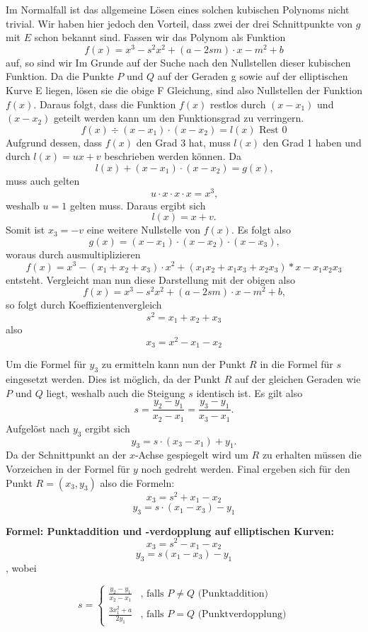 Im Normalfall ist das allgemeine Lösen eines solchen kubischen Polynoms nicht trivial. Wir haben hier jedoch den Vorteil, dass zwei der drei Schnittpunkte von $g$ mit $E$ schon bekannt sind. Fassen wir das Polynom als Funktion $$f(x) = x^3 - s^2x^2 + (a-2sm)\cdot x - m^2+b$$ auf, so sind wir Im Grunde auf der Suche nach den Nullstellen dieser kubischen Funktion. Da die Punkte $P$ und $Q$ auf der Geraden g sowie auf der elliptischen Kurve E liegen, lösen sie die obige F
Gleichung, sind also Nullstellen der Funktion $f(x)$. Daraus folgt, dass die Funktion $f(x)$ restlos durch $(x-x_1)$ und $(x-x_2)$ geteilt werden kann um den Funktionsgrad zu verringern.
$$f(x) \div (x-x_1) \cdot (x-x_2) = l(x) \text{  Rest }0$$
Aufgrund dessen, dass $f(x)$ den Grad 3 hat, muss $l(x)$ den Grad 1 haben und durch $l(x) = ux + v$ beschrieben werden können. Da $$l(x) + (x-x_1) \cdot (x-x_2) = g(x)\text{,}$$ muss auch gelten $$u \cdot x \cdot x \cdot x  = x^3\text{,}$$ weshalb $u = 1$ gelten muss. Daraus ergibt sich $$l(x) = x + v \text{.}$$ Somit ist $x_3 = -v$ eine weitere Nullstelle von $f(x)$. Es folgt also $$g(x) = (x-x_1) \cdot (x-x_2) \cdot (x-x_3) \text{,}$$ woraus durch ausmultiplizieren $$f(x) = x^3 - (x_1 + x_2 + x_3) \cdot x^2 + (x_1 x_2 + x_1 x_3 + x_2 x_3) * x - x_1 x_2 x_3$$ entsteht. Vergleicht man nun diese Darstellung mit der obigen also $$f(x) = x^3 - s^2x^2 + (a-2sm)\cdot x - m^2+b\text{,}$$ so folgt durch Koeffizientenvergleich $$s^2 = x_1 + x_2 +x_3$$ also $$x_3 = x^2 -x_1 - x_2$$

Um die Formel für $y_3$ zu ermitteln kann nun der Punkt $R$ in die Formel für $s$ eingesetzt werden. Dies ist möglich, da der Punkt $R$ auf der gleichen Geraden wie $P$ und $Q$ liegt, weshalb auch die Steigung $s$ identisch ist.
Es gilt also $$s = \frac{y_2 - y_1}{x_2  - x_1} = \frac{y_3 - y_1}{x_3  - x_1}.$$ 
Aufgelöst nach $y_3$ ergibt sich $$y_3 = s \cdot (x_3 - x_1) + y_1 \text{.}$$
Da der Schnittpunkt an der $x$-Achse gespiegelt wird um $R$ zu erhalten müssen die Vorzeichen in der Formel für $y$ noch gedreht werden. Final ergeben sich für den Punkt $R = (x_3, y_3)$ also die Formeln:
$$x_3 = s^2 + x_1 - x_2$$
$$y_3 = s \cdot (x_1 - x_3) - y_1$$


\textbf{Formel: Punktaddition und -verdopplung auf elliptischen Kurven:}
$$x_3 = s^2 - x_1 - x_2$$
$$y_3 = s(x_1 - x_3) - y_1$$,
wobei

$$s = \begin{cases}
	\frac{y_2 - y_1}{x_2 -x_1} & \text{, falls } P \neq Q \text{ (Punktaddition)}\\
	\frac{3x_1^2 + a}{2y_1} & \text{, falls } P = Q \text{ (Punktverdopplung)}
	\end{cases}
$$

